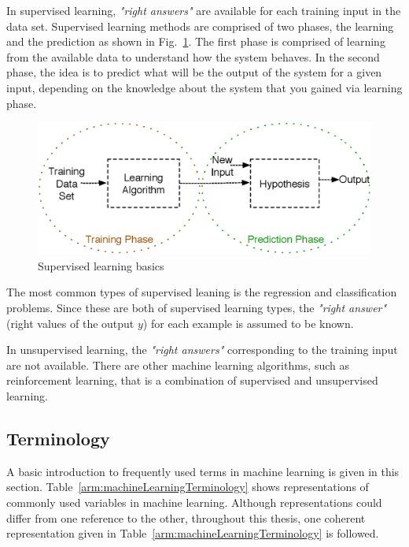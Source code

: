 In supervised learning, \textit{"right answers"} are available for each training input in the data set.
Supervised learning methods are comprised of two phases, the learning and the prediction as shown in Fig.~\ref{fig:supervisedLearningBasics}.
The first phase is comprised of learning from the available data to understand how the system behaves. 
In the second phase, the idea is to predict what will be the output of the system for a given input, depending on the knowledge about the system that you gained via learning phase. 

\begin{figure}
\begin{center}
\includegraphics[width=14cm]{figures/supervisedLearningBasics}    %
\caption{Supervised learning basics } 
\label{fig:supervisedLearningBasics}
\end{center}
\end{figure}
 
The most common types of supervised leaning is the regression and classification problems. 
Since these are both of supervised learning types, the \textit{"right answer"} (right values of the output $y$) for each example is assumed to be known. 

In unsupervised learning, the \textit{"right answers"} corresponding to the training input are not available. 
There are other machine learning algorithms, such as reinforcement learning, that is a combination of supervised and unsupervised learning. 

\subsection{Terminology}

A basic introduction to frequently used terms in machine learning is given in this section.  
Table~\ref{arm:machineLearningTerminology} shows representations of commonly used variables in machine learning. 
Although representations could differ from one reference to the other, throughout this thesis, one coherent representation given in Table~\ref{arm:machineLearningTerminology} is followed. 


